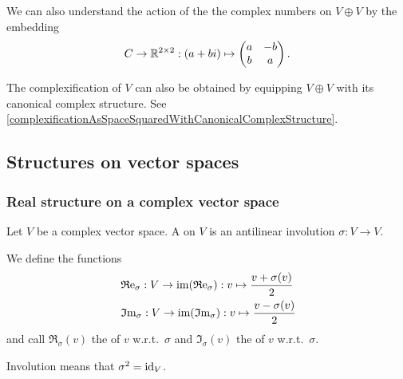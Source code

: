 We can also understand the action of the the complex numbers on $V\oplus V$ by the embedding
\[ C\to \mathbb{R}^{2\times 2}: (a+bi) \mapsto \begin{pmatrix}
a & -b \\
b & a
\end{pmatrix}. \]

The complexification of $V$ can also be obtained by equipping $V\oplus V$ with its canonical complex structure. See \ref{complexificationAsSpaceSquaredWithCanonicalComplexStructure}.

\subsection{Structures on vector spaces}
\subsubsection{Real structure on a complex vector space}
\begin{definition}
Let $V$ be a complex vector space. A  on $V$ is an antilinear involution $\sigma: V\to V$.

We define the functions
\begin{align*}
&\operatorname{\mathfrak{R}e}_\sigma: V\to \operatorname{im}(\operatorname{\mathfrak{R}e}_\sigma): v \mapsto \frac{v+\sigma(v)}{2} \\
&\operatorname{\mathfrak{I}m}_\sigma: V\to \operatorname{im}(\operatorname{\mathfrak{I}m}_\sigma): v \mapsto \frac{v-\sigma(v)}{2}
\end{align*}
and call $\Re_\sigma(v)$ the  of $v$ w.r.t.\ $\sigma$ and $\Im_\sigma(v)$ the  of $v$ w.r.t.\ $\sigma$.
\end{definition}
Involution means that $\sigma^2 = \operatorname{id}_V$.

